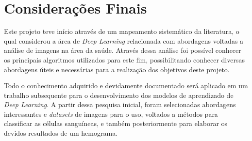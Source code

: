 \chapter{Considerações Finais}
\label{chap:conclusoes}

Este projeto teve início através de um mapeamento sistemático da literatura, o qual considerou a área de \emph{Deep Learning} relacionada com abordagens voltadas a análise de imagens na área da saúde. Através dessa análise foi possível conhecer os principais algoritmos utilizados para este fim, possibilitando conhecer diversas abordagens úteis e necessárias para a realização dos objetivos deste projeto.

Todo o conhecimento adquirido e devidamente documentado será aplicado em um trabalho subsequente para o desenvolvimento dos modelos de aprendizado de \emph{Deep Learning}. A partir dessa pesquisa inicial, foram selecionadas abordagens interessantes e \emph{datasets} de imagens para o uso, voltados a métodos para classificar as células sanguíneas, e também posteriormente para elaborar os devidos resultados de um hemograma.